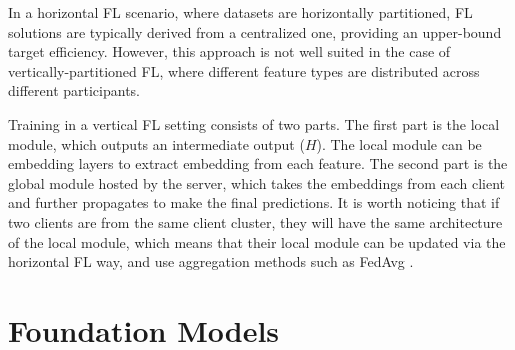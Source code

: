 \documentclass[withindex,glossary,firstyr]{cam-thesis}
\begin{document}
In a horizontal FL scenario, where datasets are horizontally partitioned, FL solutions are typically derived from a centralized one, providing an upper-bound target efficiency. However, this approach is not well suited in the case of vertically-partitioned FL, where different feature types are distributed across different participants.

Training in a vertical FL setting consists of two parts. The first part is the local module, which outputs an intermediate output ($H$). The local module can be embedding layers to extract embedding from each feature. The second part is the global module hosted by the server, which takes the embeddings from each client and further propagates to make the final predictions. It is worth noticing that if two clients are from the same client cluster, they will have the same architecture of the local module, which means that their local module can be updated via the horizontal FL way, and use aggregation methods such as FedAvg \citep{fedavg}. 




 
\section{Foundation Models}
\end{document}
